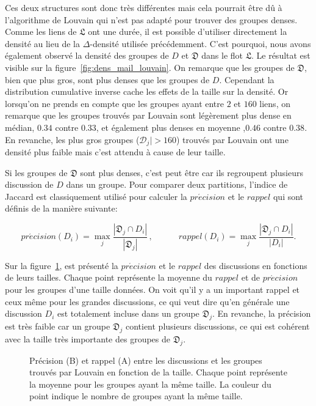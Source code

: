 Ces deux structures sont donc très différentes mais cela pourrait être dû à l'algorithme de Louvain qui n'est pas adapté pour trouver des groupes denses.
Comme les liens de $\mathfrak{L}$ ont une durée, il est possible d'utiliser directement la densité au lieu de la $\Delta$-densité utilisée précédemment.
C'est pourquoi, nous avons également observé la densité des groupes de $D$ et $\mathfrak{D}$ dans le flot $\mathfrak{L}$.
Le résultat est visible sur la figure~\ref{fig:dens_mail_louvain}.
On remarque que les groupes de $\mathfrak{D}$, bien que plus gros, sont plus denses que les groupes de $D$.
Cependant la distribution cumulative inverse cache les effets de la taille sur la densité.
Or lorsqu'on ne prends en compte que les groupes ayant entre $2$ et $160$ liens, on remarque que les groupes trouvés par Louvain sont légèrement plus dense en médian, $0.34$ contre $0.33$,  et également plus denses en moyenne ,$0.46$ contre $0.38$.\\
En revanche, les plus gros groupes ($\mathcal{D}_j|>160$) trouvés par Louvain ont une densité plus faible mais c'est attendu à cause de leur taille.

Si les groupes de $\mathfrak{D}$ sont plus denses, c'est peut être car ils regroupent plusieurs discussion de $D$ dans un groupe.
Pour comparer deux partitions, l'indice de Jaccard est classiquement utilisé pour calculer la $pr\acute{e}cision$ et le $rappel$ qui sont définis de la manière suivante:

\begin{equation*}
pr\acute{e}cision(D_i)= \max_{j} \frac{|\mathfrak{D}_j \cap D_i|}{|\mathfrak{D}_j|}\,, \quad \qquad
rappel(D_i)= \max_{j} \frac{|\mathfrak{D}_j \cap D_i|}{|D_i|}.
\label{eq:rappel}
\end{equation*}

Sur la figure~\ref{fig:rec_inclusion_niveau0}, est présenté la $pr\acute{e}cision$ et le $rappel$ des discussions en fonctions de leurs tailles.
Chaque point représente la moyenne du $rappel$ et de $pr\acute{e}cision$ pour les groupes d'une taille données.
On voit qu'il y a un important rappel et ceux même pour les grandes discussions, ce qui veut dire qu'en générale une discussion $D_i$ est totalement incluse dans un groupe $\mathfrak{D}_j$.
En revanche, la précision est très faible car un groupe $\mathfrak{D}_j$ contient plusieurs discussions, ce qui est cohérent avec la taille très importante des groupes de $\mathfrak{D}_j$.

\begin{figure}
\centering
\hfill

\hfill
{}
\hfill

\caption{Précision (B) et rappel (A) entre les discussions et les groupes trouvés par Louvain en fonction de la taille.
Chaque point représente la moyenne pour les groupes ayant la même taille. La couleur du point indique le nombre de groupes ayant la même taille.}
\label{fig:rec_inclusion_niveau0}
\end{figure}

